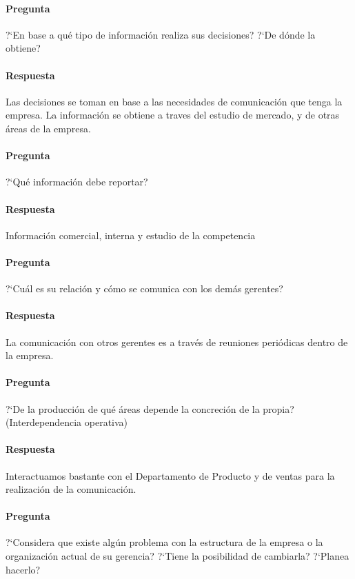 \documentclass[12pt,a4paper,spanish]{article}
\begin{document}
	\paragraph{Pregunta}
	 ?`En base a qu\'e tipo de informaci\'on realiza sus decisiones?  ?`De d\'onde la obtiene?
	\paragraph{Respuesta}
	Las decisiones se toman en base a las necesidades de comunicaci\'on que tenga la empresa. La informaci\'on se obtiene a traves del estudio de mercado, y de otras \'areas de la empresa.
	
	\paragraph{Pregunta}
	 ?`Qu\'e informaci\'on debe reportar?
	\paragraph{Respuesta}
	Informaci\'on comercial, interna y estudio de la competencia


	\paragraph{Pregunta}
	 ?`Cu\'al es su relaci\'on y c\'omo se comunica con los dem\'as gerentes?
	\paragraph{Respuesta}
	La comunicaci\'on con otros gerentes es a trav\'es de reuniones peri\'odicas dentro de la empresa.

	\paragraph{Pregunta}
	 ?`De la producci\'on de qu\'e \'areas depende la concreci\'on de la propia? (Interdependencia operativa)
	\paragraph{Respuesta}
	Interactuamos bastante con el Departamento de Producto y de ventas para la realizaci\'on de la comunicaci\'on.

	\paragraph{Pregunta}
	 ?`Considera que existe alg\'un problema con la estructura de la empresa o la organizaci\'on actual de su gerencia?  ?`Tiene la posibilidad de cambiarla?  ?`Planea hacerlo?
\end{document}
